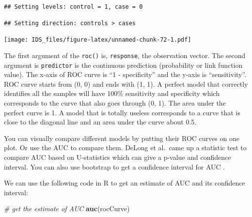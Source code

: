 \documentclass[12pt,]{krantz}
\makeatletter
\newenvironment{Shaded}{\begin{snugshade}}{\end{snugshade}}
\newcommand{\CommentTok}[1]{\textcolor[rgb]{0.37,0.37,0.37}{\textit{#1}}}
\newcommand{\DataTypeTok}[1]{\textcolor[rgb]{0.27,0.27,0.27}{#1}}
\newcommand{\DecValTok}[1]{\textcolor[rgb]{0.06,0.06,0.06}{#1}}
\newcommand{\KeywordTok}[1]{\textcolor[rgb]{0.27,0.27,0.27}{\textbf{#1}}}
\newcommand{\NormalTok}[1]{#1}
\newcommand{\OperatorTok}[1]{\textcolor[rgb]{0.43,0.43,0.43}{\textbf{#1}}}
\newcommand{\StringTok}[1]{\textcolor[rgb]{0.5,0.5,0.5}{#1}}
\newenvironment{kframe}{%
\medskip{}
\setlength{\fboxsep}{.8em}
 \def\at@end@of@kframe{}%
 \ifinner\ifhmode%
  \def\at@end@of@kframe{\end{minipage}}%
  \begin{minipage}{\columnwidth}%
 \fi\fi%
 \def\FrameCommand##1{\hskip\@totalleftmargin \hskip-\fboxsep
 \colorbox{shadecolor}{##1}\hskip-\fboxsep
     \hskip-\linewidth \hskip-\@totalleftmargin \hskip\columnwidth}%
 \MakeFramed {\advance\hsize-\width
   \@totalleftmargin\z@ \linewidth\hsize
   \@setminipage}}%
 {\par\unskip\endMakeFramed%
 \at@end@of@kframe}
\renewenvironment{Shaded}{\begin{kframe}}{\end{kframe}}
\makeatother
\begin{document}
\begin{verbatim}
## Setting levels: control = 1, case = 0
\end{verbatim}

\begin{verbatim}
## Setting direction: controls > cases
\end{verbatim}

\begin{Shaded}
\end{Shaded}

\texttt{[image: IDS\_files/figure-latex/unnamed-chunk-72-1.pdf]}

The first argument of the \texttt{roc()} is, \texttt{response}, the observation vector. The second argument is \texttt{predictor} is the continuous prediction (probability or link function value). The x-axis of ROC curve is ``1 - specificity'' and the y-axis is ``sensitivity''. ROC curve starts from (0, 0) and ends with (1, 1). A perfect model that correctly identifies all the samples will have 100\% sensitivity and specificity which corresponds to the curve that also goes through (0, 1). The area under the perfect curve is 1. A model that is totally useless corresponds to a curve that is close to the diagonal line and an area under the curve about 0.5.

You can visually compare different models by putting their ROC curves on one plot. Or use the AUC to compare them. DeLong et al.~came up a statistic test to compare AUC based on U-statistics \citep{delong1988} which can give a p-value and confidence interval. You can also use bootstrap to get a confidence interval for AUC \citep{hall2004}.

We can use the following code in R to get an estimate of AUC and its confidence interval:

\begin{Shaded}
\begin{Highlighting}[]
\CommentTok{# get the estimate of AUC}
\KeywordTok{auc}\NormalTok{(rocCurve)}
\end{Highlighting}
\end{Shaded}
\end{document}
